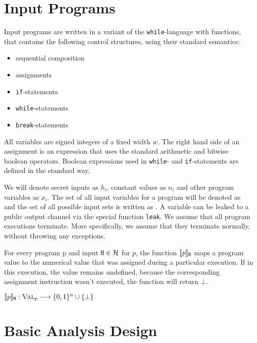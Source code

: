 \section{Input Programs}\label{sec:inputLang}

Input programs are written in a variant of the \texttt{while}-language with functions, that contains the following control structures, using their standard semantics:
\begin{itemize}
    \setlength\itemsep{0em}
    \item sequential composition
    \item assignments
    \item \texttt{if}-statements
    \item \texttt{while}-statements
    \item \texttt{break}-statements
\end{itemize}
All variables are signed integers of a fixed width $w$. The right hand side of an assignment is an expression that uses the standard arithmetic and bitwise boolean operators. Boolean expressions used in \texttt{while}- and \texttt{if}-statements are defined in the standard way.

We will denote secret inputs as $h_i$, constant values as $n_i$ and other program variables as $x_i$. The set of all input variables for a program will be denoted as \In and the set of all possible input sets is written as \allIn. A variable can be leaked to a public output channel via the special function \texttt{leak}. We assume that all program executions terminate. More specifically, we assume that they terminate normally, without throwing any exceptions.

\begin{definition}
For every program p and input $\mathtt{H} \in \mathcal{H}$ for $p$, the function $\llbracket p \rrbracket_{\mathtt{H}}$ maps a program value to the numerical value that was assigned during a particular execution. If in this execution, the value remains undefined, because the corresponding assignment instruction wasn't executed, the function will return $\bot$.
    \begin{center}
        $\llbracket p \rrbracket_{\mathtt{H}}: \textsc{Val}_p \longrightarrow \{0, 1\}^n \cup \{\bot\}$
    \end{center}
\end{definition}

\section{Basic Analysis Design}

